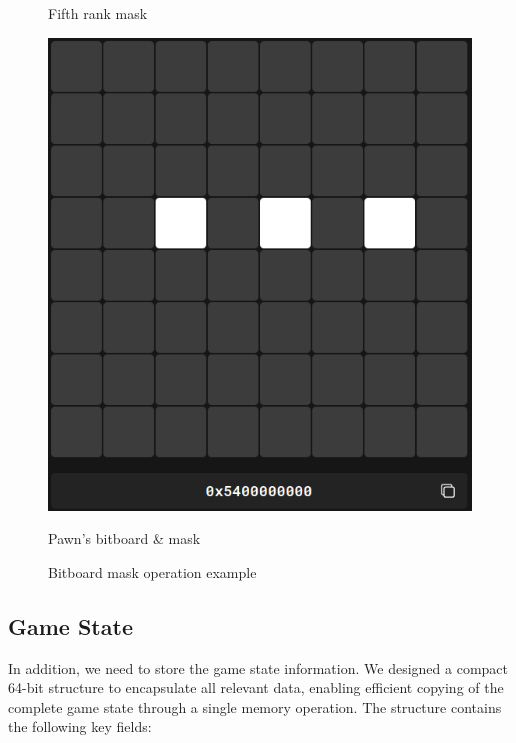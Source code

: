 \begin{figure}[H]
\begin{minipage}[c]{0.30\textwidth}
        \caption*{Fifth rank mask}
    \end{minipage}
    \hfill
    \begin{minipage}[c]{0.30\textwidth}
        \centering
        \includegraphics[width=\textwidth]{Imagenes/bitboardMaskResult.png}
        \caption*{Pawn's bitboard \& mask}
    \end{minipage}
    \caption{Bitboard mask operation example}
    \label{fig:bitboardMaskOperation}
\end{figure}

\vspace{2em}

\subsection*{Game State}

\noindent In addition, we need to store the game state information. We designed a compact 64-bit structure to encapsulate all relevant data, enabling efficient copying of the complete game state through a single memory operation. The structure contains the following key fields:

